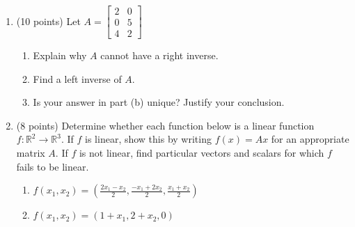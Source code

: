 \documentclass[11pt,fleqn]{article}
\newcommand{\bbm}{\begin{bmatrix}}
\newcommand{\ebm}{\end{bmatrix}}
\begin{document}
\begin{enumerate}
\vfill
\newpage
\item (10 points) Let $A=\bbm 2&0\\0&5\\4&2 \ebm$
	\begin{enumerate}
	\item Explain why $A$ cannot have a right inverse.
	\vfill
	\item Find a left inverse of $A.$ 
	\vfill
	\item Is your answer in part (b) unique? Justify your conclusion.
	\end{enumerate}
\vfill
\newpage
\item (8 points) Determine whether each function below is a linear function $f: \mathbb{R}^2 \to \mathbb{R}^3.$ If $f$ is linear, show this by writing $f(x)=Ax$ for an appropriate matrix $A$. If $f$ is not linear, find particular vectors and scalars for which $f$ fails to be linear.
	\begin{enumerate}
	\item $f(x_1,x_2)=(\frac{2x_1-x_2}{2}, \frac{-x_1+2x_2}{2}, \frac{x_1+x_2}{2})$
	\vfill
	\item $f(x_1,x_2)=(1+x_1,2+x_2,0)$
	\vfill
	\end{enumerate}
\end{enumerate}
\end{document}
